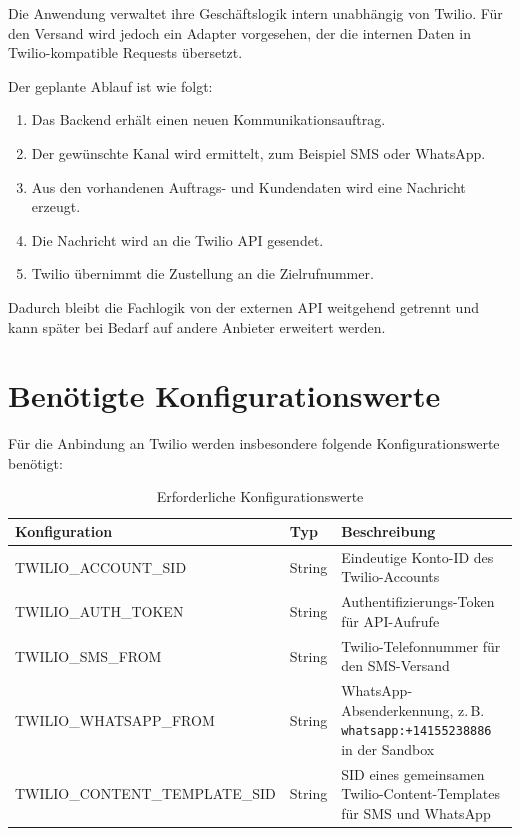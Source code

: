 \documentclass[12pt,a4paper]{article}
\begin{document}
Die Anwendung verwaltet ihre Geschäftslogik intern unabhängig von
Twilio. Für den Versand wird jedoch ein Adapter vorgesehen, der die
internen Daten in Twilio-kompatible Requests übersetzt.

Der geplante Ablauf ist wie folgt:

\begin{enumerate}
    \item Das Backend erhält einen neuen Kommunikationsauftrag.
    \item Der gewünschte Kanal wird ermittelt, zum Beispiel SMS oder
    WhatsApp.
    \item Aus den vorhandenen Auftrags- und Kundendaten wird eine
    Nachricht erzeugt.
    \item Die Nachricht wird an die Twilio API gesendet.
    \item Twilio übernimmt die Zustellung an die Zielrufnummer.
\end{enumerate}

Dadurch bleibt die Fachlogik von der externen API weitgehend getrennt
und kann später bei Bedarf auf andere Anbieter erweitert werden.

\section{Benötigte Konfigurationswerte}

Für die Anbindung an Twilio werden insbesondere folgende
Konfigurationswerte benötigt:

\begin{table}[h]
    \centering
    \begin{tabularx}{\textwidth}{l l X}
        \toprule
        \textbf{Konfiguration} & \textbf{Typ} & \textbf{Beschreibung} \\
        \midrule
        TWILIO\_ACCOUNT\_SID
        & String
        & Eindeutige Konto-ID des Twilio-Accounts \\

        TWILIO\_AUTH\_TOKEN
        & String
        & Authentifizierungs-Token für API-Aufrufe \\

        TWILIO\_SMS\_FROM
        & String
        & Twilio-Telefonnummer für den SMS-Versand \\

        TWILIO\_WHATSAPP\_FROM
        & String
        & WhatsApp-Absenderkennung, z.\,B. \texttt{whatsapp:+14155238886} in der Sandbox \\

        TWILIO\_CONTENT\_TEMPLATE\_SID
        & String
        & SID eines gemeinsamen Twilio-Content-Templates für SMS und WhatsApp \\
        \bottomrule
    \end{tabularx}
    \caption{Erforderliche Konfigurationswerte}
\end{table}
\end{document}
